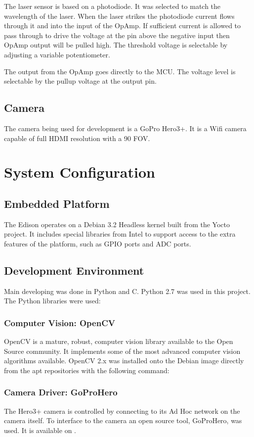 \documentclass[botnum, fleqn]{unmeethesis}
\begin{document}
The laser sensor is based on a photodiode. It was selected to match the wavelength of the laser. When the laser strikes the photodiode current flows through it and into the input of the OpAmp. If sufficient current is allowed to pass through to drive the voltage at the pin above the negative input then OpAmp output will be pulled high. The threshold voltage is selectable by adjusting a variable potentiometer. 

The output from the OpAmp goes directly to the MCU. The voltage level is selectable by the pullup voltage at the output pin.

\subsection*{Camera}
The camera being used for development is a GoPro Hero3+. It is a Wifi camera capable of full HDMI resolution with a 90 FOV. 

\section*{System Configuration}

\subsection*{Embedded Platform}
The Edison operates on a Debian 3.2 Headless kernel built from the Yocto project. It includes special libraries from Intel to support access to the extra features of the platform, such as GPIO ports and ADC ports. 

\subsection*{Development Environment}
Main developing was done in Python and C. Python 2.7 was used in this project. The Python libraries were used:

\subsubsection{Computer Vision: OpenCV}
OpenCV is a mature, robust, computer vision library available to the Open Source community. It implements some of the most advanced computer vision algorithms available. OpenCV 2.x was installed onto the Debian image directly from the apt repositories with the following command:
\subsubsection{Camera Driver: GoProHero}
The Hero3+ camera is controlled by connecting to its Ad Hoc network on the camera itself. To interface to the camera an open source tool, GoProHero, was used. It is available on \cite{goprohero}.
\end{document}
